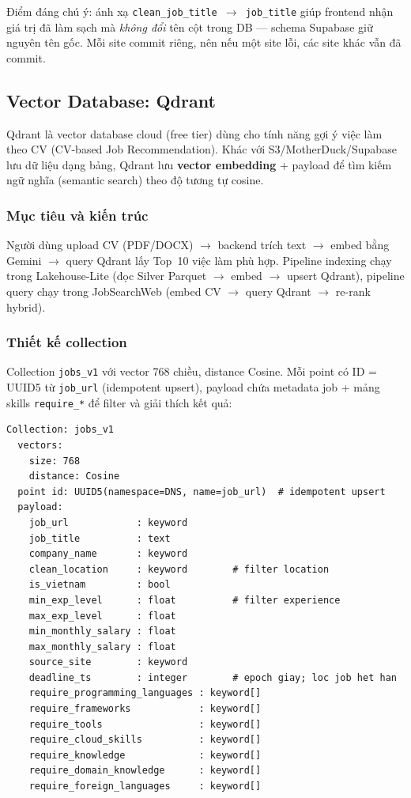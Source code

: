 Điểm đáng chú ý: ánh xạ \texttt{clean\_job\_title $\rightarrow$ job\_title}
giúp frontend nhận giá trị đã làm sạch mà \emph{không đổi} tên cột trong DB ---
schema Supabase giữ nguyên tên gốc. Mỗi site commit riêng, nên nếu một site lỗi,
các site khác vẫn đã commit.


\subsection{Vector Database: Qdrant}
\label{subsec:qdrant}

Qdrant là vector database cloud (free tier) dùng cho tính năng gợi ý việc làm
theo CV (CV-based Job Recommendation). Khác với S3/MotherDuck/Supabase lưu dữ
liệu dạng bảng, Qdrant lưu \textbf{vector embedding} + payload để tìm kiếm ngữ
nghĩa (semantic search) theo độ tương tự cosine.

\subsubsection{Mục tiêu và kiến trúc}
\label{subsubsec:qdrant-overview}

Người dùng upload CV (PDF/DOCX) $\rightarrow$ backend trích text $\rightarrow$
embed bằng Gemini $\rightarrow$ query Qdrant lấy Top~10 việc làm phù hợp. Pipeline
indexing chạy trong Lakehouse-Lite (đọc Silver Parquet $\rightarrow$ embed
$\rightarrow$ upsert Qdrant), pipeline query chạy trong JobSearchWeb (embed CV
$\rightarrow$ query Qdrant $\rightarrow$ re-rank hybrid).

\subsubsection{Thiết kế collection}
\label{subsubsec:qdrant-collection}

Collection \texttt{jobs\_v1} với vector 768 chiều, distance Cosine. Mỗi point
có ID = UUID5 từ \texttt{job\_url} (idempotent upsert), payload chứa metadata
job + mảng skills \texttt{require\_*} để filter và giải thích kết quả:

\begin{lstlisting}[caption={Thiết kế Qdrant collection \texttt{jobs\_v1}}, label={lst:qdrant-collection}]
Collection: jobs_v1
  vectors:
    size: 768
    distance: Cosine
  point id: UUID5(namespace=DNS, name=job_url)  # idempotent upsert
  payload:
    job_url            : keyword
    job_title          : text
    company_name       : keyword
    clean_location     : keyword        # filter location
    is_vietnam         : bool
    min_exp_level      : float          # filter experience
    max_exp_level      : float
    min_monthly_salary : float
    max_monthly_salary : float
    source_site        : keyword
    deadline_ts        : integer        # epoch giay; loc job het han
    require_programming_languages : keyword[]
    require_frameworks            : keyword[]
    require_tools                 : keyword[]
    require_cloud_skills          : keyword[]
    require_knowledge             : keyword[]
    require_domain_knowledge      : keyword[]
    require_foreign_languages     : keyword[]
\end{lstlisting}

